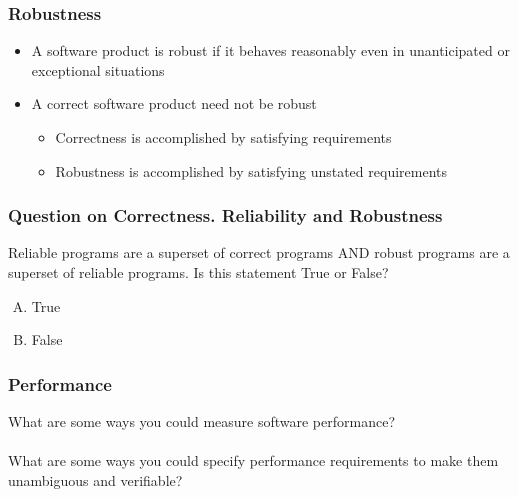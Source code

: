 \documentclass[t,12pt,numbers,fleqn]{beamer}
\begin{document}

\begin{frame}
\frametitle{Robustness}

\begin{itemize}
\item A software product is robust if it behaves reasonably even in
  unanticipated or exceptional situations
\item A correct software product need not be robust
\begin{itemize}
\item Correctness is accomplished by satisfying requirements
\item Robustness is accomplished by satisfying unstated requirements
\end{itemize}
\end{itemize}

\end{frame}


\begin{frame}
\frametitle{Question on Correctness. Reliability and Robustness}

Reliable programs are a superset of correct programs AND robust programs are a
superset of reliable programs.  Is this statement True or False?
\begin{enumerate}[A.]
\item True
\item False %
\end{enumerate}

\end{frame}


\begin{frame}
\frametitle{Performance}

What are some ways you could measure software performance?\\
~\\
What are some ways you could specify performance requirements to make them
unambiguous and verifiable?

\end{frame}

\end{document}
